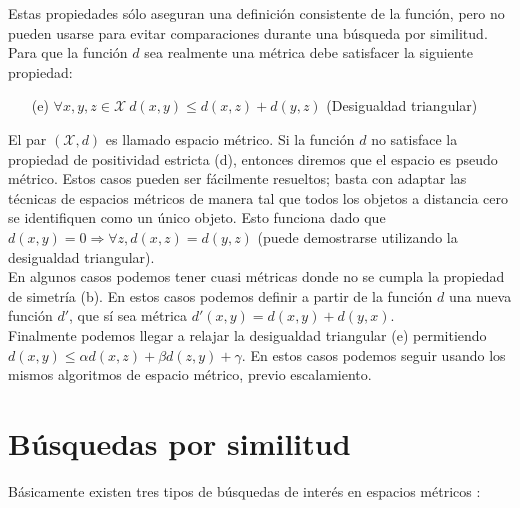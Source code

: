 Estas propiedades s\'olo aseguran una definici\'on consistente de la funci\'on, pero no pueden usarse para evitar comparaciones durante una b\'usqueda por similitud. Para que la funci\'on $d$ sea realmente una m\'etrica debe satisfacer la siguiente propiedad:

\begin{enumerate}
\item  [(e)] $\forall x,y,z \in \mathcal{X}\: d(x,y) \leq d(x,z) + d(y,z)$ (Desigualdad triangular)
\end{enumerate}

El par $(\mathcal{X},d)$ es llamado espacio m\'etrico. Si la funci\'on $d$ no satisface la propiedad de positividad estricta (d), entonces diremos que el espacio es pseudo m\'etrico. Estos casos pueden ser f\'acilmente resueltos; basta con adaptar las t\'ecnicas de espacios m\'etricos de manera tal que todos los objetos a distancia cero se identifiquen como un \'unico objeto. Esto funciona dado que $d(x,y) = 0 \Rightarrow \forall z, d(x,z) = d(y,z)$ (puede demostrarse utilizando la desigualdad triangular).\\

En algunos casos podemos tener cuasi m\'etricas donde no se cumpla la propiedad de simetr\'ia (b). En estos casos podemos definir a partir de la funci\'on $d$ una nueva funci\'on $d'$, que s\'i sea m\'etrica $d'(x,y) = d(x,y) + d(y,x)$.\\

Finalmente podemos llegar a relajar la desigualdad triangular (e) permitiendo $d(x,y)  \leq \alpha d(x,z) +  \beta d(z,y) + \gamma$. En estos casos podemos seguir usando los mismos algoritmos de espacio m\'etrico, previo escalamiento.

\section{B\'usquedas por similitud}
B\'asicamente existen tres tipos de b\'usquedas de inter\'es en espacios m\'etricos \cite{oursurvey}:

